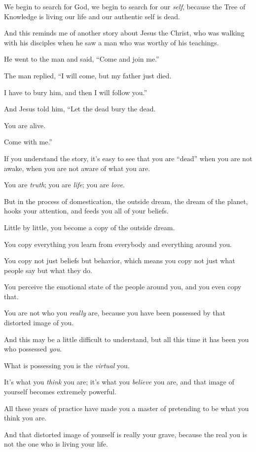 \documentclass{article}
\numberwithin{equation}{section}
\begin{document}
We begin to search for God, we begin to search for our \textit{self}, because the Tree of Knowledge is living our life and our authentic self is dead.

%
And this reminds me of another story about Jesus the Christ, who was walking with his disciples when he saw a man who was worthy of his teachings.

He went to the man and said, ``Come and join me.''

The man replied, ``I will come, but my father just died.

I have to bury him, and then I will follow you.''

And Jesus told him, ``Let the dead bury the dead.

You are alive.

Come with me.''

If you understand the story, it's easy to see that you are ``dead'' when you are not awake, when you are not aware of what you are.

You are \textit{truth}; you are \textit{life}; you are \textit{love}.

But in the process of domestication, the outside dream, the dream of the planet, hooks your attention, and feeds you all of your beliefs.

Little by little, you become a copy of the outside dream.

You copy everything you learn from everybody and everything around you.

You copy not just beliefs but behavior, which means you copy not just what people say but what they do.

You perceive the emotional state of the people around you, and you even copy that.

%
You are not who you \textit{really} are, because you have been possessed by that distorted image of you.

And this may be a little difficult to understand, but all this time it has been you who possessed \textit{you}.

What is possessing you is the \textit{virtual} you.

It's what you \textit{think} you are; it's what you \textit{believe} you are, and that image of yourself becomes extremely powerful.

All these years of practice have made you a master of pretending to be what you think you are.

And that distorted image of yourself is really your grave, because the real you is not the one who is living your life.
\end{document}
